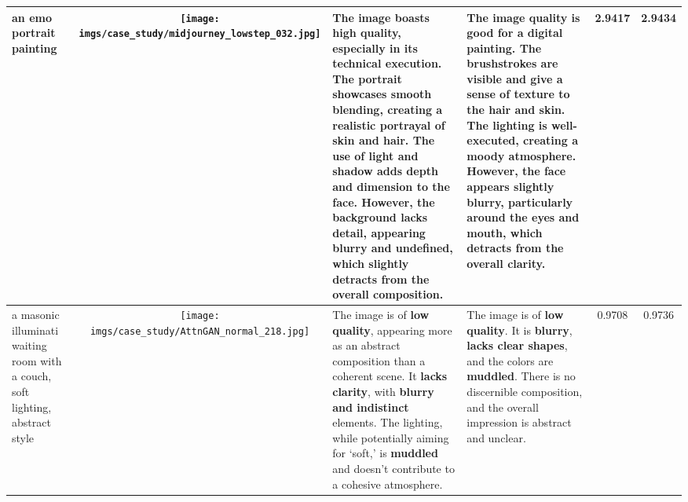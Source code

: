 \begin{table*}
\begin{tabular}{m{2cm}c m{4cm}m{4cm}cc}
        \midrule
        an emo portrait painting &
        \begin{minipage}{.2\textwidth}
            \texttt{[image: imgs/case\_study/midjourney\_lowstep\_032.jpg]}
        \end{minipage} & 
        The image boasts \textcolor{positive}{\textbf{high quality}}, especially in its technical execution. The portrait showcases \textcolor{positive}{\textbf{smooth blending}}, creating a \textcolor{positive}{\textbf{realistic}} portrayal of skin and hair. The use of light and shadow adds depth and dimension to the face. However, the \textcolor{negative}{\textbf{background lacks detail}}, appearing \textcolor{negative}{\textbf{blurry and undefined}}, which slightly detracts from the overall composition. &
        The image quality is \textcolor{positive}{\textbf{good}} for a digital painting. The brushstrokes are visible and give a sense of texture to the hair and skin. The lighting is \textcolor{positive}{\textbf{well-executed}}, creating a moody atmosphere. However, the face appears \textcolor{negative}{\textbf{slightly blurry}}, particularly around the eyes and mouth, which detracts from the overall clarity. &
        2.9417 & 2.9434 \\
        
        \midrule
        a masonic illuminati waiting room with a couch, soft lighting, abstract style &
        \begin{minipage}{.2\textwidth}
            \texttt{[image: imgs/case\_study/AttnGAN\_normal\_218.jpg]}
        \end{minipage} & 
        The image is of \textcolor{negative}{\textbf{low quality}}, appearing more as an abstract composition than a coherent scene. It \textcolor{negative}{\textbf{lacks clarity}}, with \textcolor{negative}{\textbf{blurry and indistinct}} elements. The lighting, while potentially aiming for `soft,' is \textcolor{negative}{\textbf{muddled}} and doesn't contribute to a cohesive atmosphere. & 
        The image is of \textcolor{negative}{\textbf{low quality}}. It is \textcolor{negative}{\textbf{blurry}}, \textcolor{negative}{\textbf{lacks clear shapes}}, and the colors are \textcolor{negative}{\textbf{muddled}}. There is no discernible composition, and the overall impression is abstract and unclear. & 
        0.9708 & 0.9736 \\
        

\end{tabular}
\end{table*}

